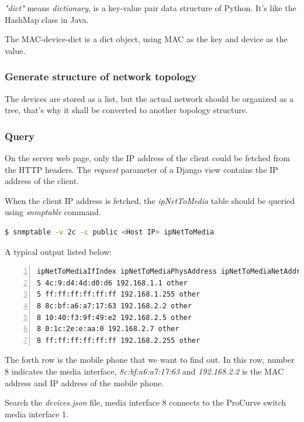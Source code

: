 \textit{"dict"} means \textit{dictionary}, is a key-value pair data structure of Python. It's like the HashMap class in Java.

The MAC-device-dict is a dict object, using MAC as the key and device as the value.

\subsubsection{Generate structure of network topology}

The devices are stored as a list, but the actual network should be organized as a tree, that's why it shall be converted to another topology structure.

\subsubsection{Query}

On the server web page, only the IP address of the client could be fetched from the HTTP headers. The \textit{request} parameter of a Django view contains the IP address of the client.

When the client IP address is fetched, the \textit{ipNetToMedia} table should be queried using \textit{snmptable} command.

\begin{lstlisting}[language=bash, caption={List all connected devices}]
$ snmptable -v 2c -c public <Host IP> ipNetToMedia
\end{lstlisting}

A typical output listed below:

\begin{lstlisting}[numbers=left, firstnumber=1, numberfirstline=true]
ipNetToMediaIfIndex ipNetToMediaPhysAddress ipNetToMediaNetAddress ipNetToMediaType
5 4c:9:d4:4d:d0:d6 192.168.1.1 other
5 ff:ff:ff:ff:ff:ff 192.168.1.255 other
8 8c:bf:a6:a7:17:63 192.168.2.2 other
8 10:40:f3:9f:49:e2 192.168.2.5 other
8 0:1c:2e:e:aa:0 192.168.2.7 other
8 ff:ff:ff:ff:ff:ff 192.168.2.255 other
\end{lstlisting}

The forth row is the mobile phone that we want to find out. In this row, number 8 indicates the media interface, \textit{8c:bf:a6:a7:17:63} and \textit{192.168.2.2} is the MAC address and IP address of the mobile phone.

Search the \textit{devices.json} file, media interface 8 connects to the ProCurve switch media interface 1.

